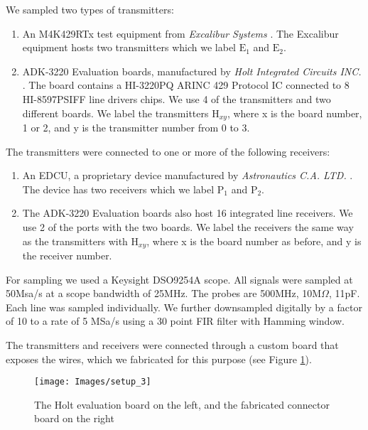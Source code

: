\documentclass[compsoc,conference,a4paper,10pt,times]{IEEEtran}
\begin{document}
  We sampled two types of transmitters:
  \begin{enumerate}
     \item An M4K429RTx test equipment from \textit{Excalibur Systems} \cite{excalibur2019m4k429rtx}. The Excalibur equipment hosts two transmitters which we label \(\text{E}_1\) and \(\text{E}_2\).
     \item ADK-3220 Evaluation boards, manufactured by \textit{Holt Integrated Circuits INC.} \cite{holt2019evaluation}. The board contains a HI-3220PQ ARINC 429 Protocol IC connected to 8 HI-8597PSIFF line drivers chips. We use 4 of the transmitters and two different boards. We label the transmitters \(\text{H}_{xy}\), where x is the board number, 1 or 2, and y is the transmitter number from 0 to 3.
  \end{enumerate}
  
  The transmitters were connected to one or more of the following receivers:
  \begin{enumerate}
    \item An EDCU, a proprietary device manufactured by \textit{Astronautics C.A. LTD.} \cite{astronautics2019edcu}. The device has two receivers which we label \(\text{P}_1\) and \(\text{P}_2\).
    \item The ADK-3220 Evaluation boards also host 16 integrated line receivers. We use 2 of the ports with the two boards. We label the receivers the same way as the transmitters with \(\text{H}_{xy}\), where x is the board number as before, and y is the receiver number.
  \end{enumerate}
  
  For sampling we used a Keysight DSO9254A scope. All signals were sampled at 50Msa/s at a scope bandwidth of 25MHz. The probes are 500MHz, 10M\(\Omega\), 11pF. Each line was sampled individually. We further downsampled digitally by a factor of 10 to a rate of 5 MSa/s using a 30 point FIR filter with Hamming window.
  
  The transmitters and receivers were connected through a custom board that exposes the wires, which we fabricated for this purpose (see Figure \ref{fig:SetupImage}).
  
  \begin{figure}[t]
    \centering
    \texttt{[image: Images/setup\_3]}
    \caption{The Holt evaluation board on the left, and the fabricated connector board on the right}
    \label{fig:SetupImage}
  \end{figure}
  
\end{document}

